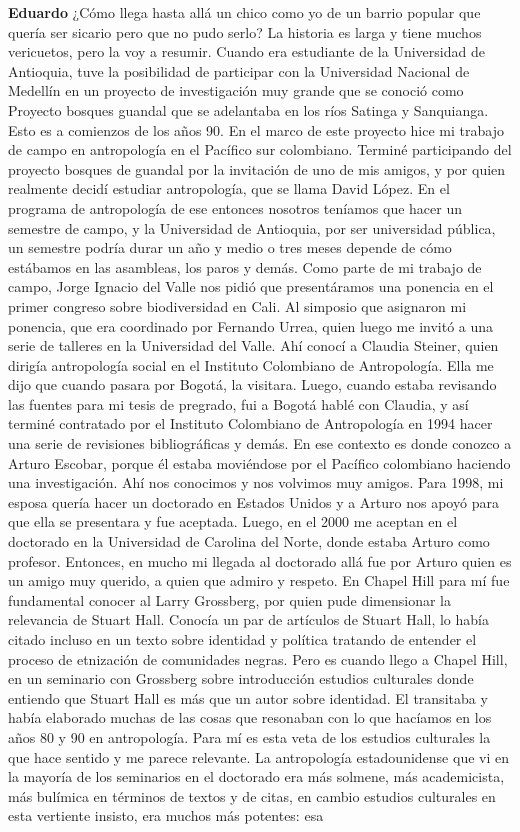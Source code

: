 \documentclass[
  spanish,
  11pt,
  a4paper,
]{scrbook}
\newenvironment{transcripcion}{
    \begin{list}{}{
        \setlength{\leftmargin}{1.5em}  %
        \setlength{\rightmargin}{0em}
        \setlength{\itemsep}{0.2em}     %
        \setlength{\parsep}{0.0em}
        \setlength{\listparindent}{0pt}
    }
}{
    \end{list}
}
\newcommand{\personaje}[1]{\textbf{#1}\quad}
\begin{document}
\begin{transcripcion}
\item \personaje{Eduardo} ¿Cómo llega hasta allá un chico como yo de un barrio popular que quería ser sicario pero que no pudo serlo? La historia es larga y tiene muchos vericuetos, pero la voy a resumir. Cuando era estudiante de la Universidad de Antioquia, tuve la posibilidad de participar con la Universidad Nacional de Medellín en un proyecto de investigación muy grande que se conoció como Proyecto bosques guandal que se adelantaba en los ríos Satinga y Sanquianga. Esto es a comienzos de los años 90. En el marco de este proyecto hice mi trabajo de campo en antropología en el Pacífico sur colombiano. Terminé participando del proyecto bosques de guandal por la invitación de uno de mis amigos, y por quien realmente decidí estudiar antropología, que se llama David López. En el programa de antropología de ese entonces nosotros teníamos que hacer un semestre de campo, y la Universidad de Antioquia, por ser universidad pública, un semestre podría durar un año y medio o tres meses depende de cómo estábamos en las asambleas, los paros y demás. Como parte de mi trabajo de campo, Jorge Ignacio del Valle nos pidió que presentáramos una ponencia en el primer congreso sobre biodiversidad en Cali. Al simposio que asignaron mi ponencia, que era coordinado por Fernando Urrea, quien luego me invitó a una serie de talleres en la Universidad del Valle. Ahí conocí a Claudia Steiner, quien dirigía antropología social en el Instituto Colombiano de Antropología. Ella me dijo que cuando pasara por Bogotá, la visitara. Luego, cuando estaba revisando las fuentes para mi tesis de pregrado, fui a Bogotá hablé con Claudia, y así terminé contratado por el Instituto Colombiano de Antropología en 1994 hacer una serie de revisiones bibliográficas y demás. En ese contexto es donde conozco a Arturo Escobar, porque él estaba moviéndose por el Pacífico colombiano haciendo una investigación. Ahí nos conocimos y nos volvimos muy amigos. Para 1998, mi esposa quería hacer un doctorado en Estados Unidos y a Arturo nos apoyó para que ella se presentara y fue aceptada. Luego, en el 2000 me aceptan en el doctorado en la Universidad de Carolina del Norte, donde estaba Arturo como profesor. Entonces, en mucho mi llegada al doctorado allá fue por Arturo quien es un amigo muy querido, a quien que admiro y respeto. En Chapel Hill para mí fue fundamental conocer al Larry Grossberg, por quien pude dimensionar la relevancia de Stuart Hall. Conocía un par de artículos de Stuart Hall, lo había citado incluso en un texto sobre identidad y política tratando de entender el proceso de etnización de comunidades negras. Pero es cuando llego a Chapel Hill, en un seminario con Grossberg sobre introducción estudios culturales donde entiendo que Stuart Hall es más que un autor sobre identidad. El transitaba y había elaborado muchas de las cosas que resonaban con lo que hacíamos en los años 80 y 90 en antropología. Para mí es esta veta de los estudios culturales la que hace sentido y me parece relevante. La antropología estadounidense que vi en la mayoría de los seminarios en el doctorado era más solmene, más academicista, más bulímica en términos de textos y de citas, en cambio estudios culturales en esta vertiente insisto, era muchos más potentes: esa 
\end{transcripcion}
\end{document}
